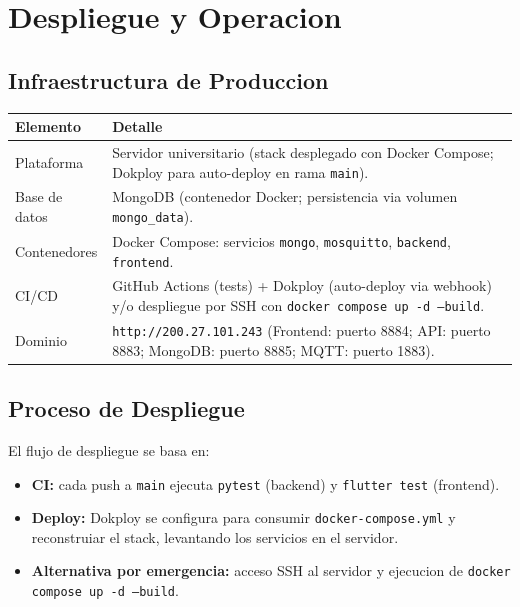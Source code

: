 \documentclass[11pt, a4paper]{article}
\begin{document}
\section{Despliegue y Operacion}

\subsection{Infraestructura de Produccion}
\begin{longtable}{@{} p{3cm} p{11cm} @{}}
  \toprule
  \textbf{Elemento} & \textbf{Detalle} \\
  \midrule
  Plataforma & Servidor universitario (stack desplegado con Docker Compose; Dokploy para auto-deploy en rama \texttt{main}). \\
  \midrule
  Base de datos & MongoDB (contenedor Docker; persistencia via volumen \texttt{mongo\_data}). \\
  \midrule
  Contenedores & Docker Compose: servicios \texttt{mongo}, \texttt{mosquitto}, \texttt{backend}, \texttt{frontend}. \\
  \midrule
  CI/CD & GitHub Actions (tests) + Dokploy (auto-deploy via webhook) y/o despliegue por SSH con \texttt{docker compose up -d --build}. \\
  \midrule
  Dominio & \texttt{http://200.27.101.243} (Frontend: puerto 8884; API: puerto 8883; MongoDB: puerto 8885; MQTT: puerto 1883). \\
  \bottomrule
\end{longtable}

\subsection{Proceso de Despliegue}
El flujo de despliegue se basa en:
\begin{itemize}
  \item \textbf{CI:} cada push a \texttt{main} ejecuta \texttt{pytest} (backend) y \texttt{flutter test} (frontend).
  \item \textbf{Deploy:} Dokploy se configura para consumir \texttt{docker-compose.yml} y reconstruiar el stack, levantando los servicios en el servidor.
  \item \textbf{Alternativa por emergencia:} acceso SSH al servidor y ejecucion de \texttt{docker compose up -d --build}.
\end{itemize}
\end{document}
